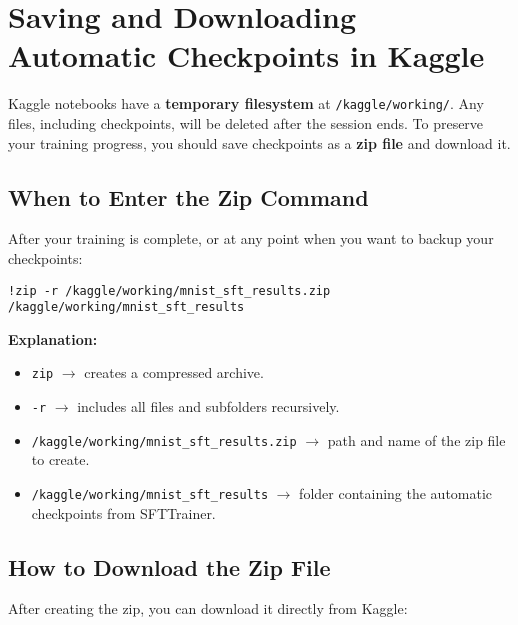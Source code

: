\documentclass[a4paper, 12pt]{article}
\begin{document}
\section*{Saving and Downloading Automatic Checkpoints in Kaggle}

Kaggle notebooks have a \textbf{temporary filesystem} at \texttt{/kaggle/working/}. 
Any files, including checkpoints, will be deleted after the session ends. 
To preserve your training progress, you should save checkpoints as a \textbf{zip file} and download it.

\subsection*{When to Enter the Zip Command}

After your training is complete, or at any point when you want to backup your checkpoints:

\begin{tcolorbox}[colback=yellow!5!white, colframe=yellow!75!black, title=Zip Checkpoints Command]
\begin{verbatim}
!zip -r /kaggle/working/mnist_sft_results.zip /kaggle/working/mnist_sft_results
\end{verbatim}
\end{tcolorbox}

\textbf{Explanation:}
\begin{itemize}
    \item \texttt{zip} $\rightarrow$ creates a compressed archive.
    \item \texttt{-r} $\rightarrow$ includes all files and subfolders recursively.
    \item \texttt{/kaggle/working/mnist\_sft\_results.zip} $\rightarrow$ path and name of the zip file to create.
    \item \texttt{/kaggle/working/mnist\_sft\_results} $\rightarrow$ folder containing the automatic checkpoints from SFTTrainer.
\end{itemize}

\subsection*{How to Download the Zip File}

After creating the zip, you can download it directly from Kaggle:
\end{document}
